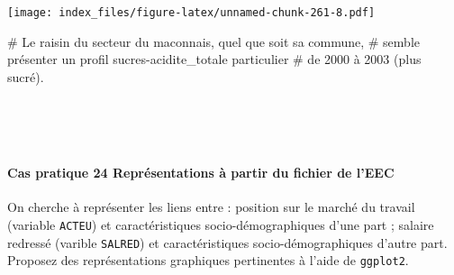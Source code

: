 \documentclass[12pt,]{article}
\newenvironment{Shaded}{}{}
\newcommand{\CommentTok}[1]{\textcolor[rgb]{0.00,0.50,0.00}{{#1}}}
\let\oldparagraph\paragraph
\renewcommand{\paragraph}[1]{\oldparagraph{#1}\mbox{}}
\begin{document}
\begin{enumerate}
  \texttt{[image: index\_files/figure-latex/unnamed-chunk-261-8.pdf]}

\begin{Shaded}
\begin{Highlighting}[]
\CommentTok{# Le raisin du secteur du maconnais, quel que soit sa commune, }
\CommentTok{# semble présenter un profil sucres-acidite_totale particulier}
\CommentTok{# de 2000 à 2003 (plus sucré).}
\end{Highlighting}
\end{Shaded}

  ~
\end{enumerate}

~

\paragraph{\texorpdfstring{\textbf{Cas pratique 24} Représentations à
partir du fichier de
l'EEC}{Cas pratique 24 Représentations à partir du fichier de l'EEC}}\label{cas-pratique-24-representations-a-partir-du-fichier-de-leec}

On cherche à représenter les liens entre : position sur le marché du
travail (variable \texttt{ACTEU}) et caractéristiques
socio-démographiques d'une part ; salaire redressé (varible
\texttt{SALRED}) et caractéristiques socio-démographiques d'autre part.
Proposez des représentations graphiques pertinentes à l'aide de
\texttt{ggplot2}.
\end{document}

